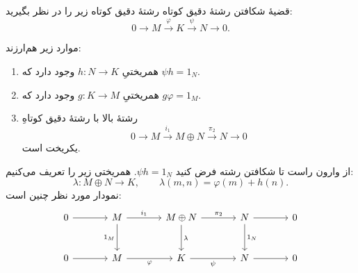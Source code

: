\begin{frame}[t]{قضیهٔ شکافتن رشتهٔ دقیق کوتاه}
    \label{lec16:splitting-lemma}
    رشتهٔ دقیق کوتاه زیر را در نظر بگیرید:
    \[
        0\longrightarrow M\xrightarrow{\varphi}K
        \xrightarrow{\psi}N\longrightarrow0.
    \]
    \begin{theorem}
        موارد زیر هم‌ارزند:
        \begin{enumerate}
            \item همریختیِ \(h:N\to K\) وجود دارد که \(\psi h=1_N\).
            \item همریختیِ \(g:K\to M\) وجود دارد که \(g\varphi=1_M\).
            \item رشتهٔ بالا با رشتهٔ دقیق کوتاهِ
            \[
                0\longrightarrow M\xrightarrow{i_1}M\oplus N
                \xrightarrow{\pi_2}N\longrightarrow0
            \]
            یکریخت است.
        \end{enumerate}
    \end{theorem}
\end{frame}

\begin{frame}[t]{از وارون راست تا شکافتن رشته}
    \label{lec16:split-right-map}
    فرض کنید \(\psi h=1_N\). همریختی زیر را تعریف می‌کنیم:
    \[
        \lambda:M\oplus N\longrightarrow K,
        \qquad \lambda(m,n)=\varphi(m)+h(n).
    \]
    نمودار مورد نظر چنین است:
    \[
    \begin{tikzcd}[ampersand replacement=\&,column sep=large,row sep=large]
        0\arrow[r]\& M\arrow[r,"i_1"]\arrow[d,"1_M"']
        \&M\oplus N\arrow[r,"\pi_2"]\arrow[d,"\lambda"]
        \&N\arrow[r]\arrow[d,"1_N"]\&0\\
        0\arrow[r]\& M\arrow[r,"\varphi"']
        \&K\arrow[r,"\psi"']\&N\arrow[r]\&0
    \end{tikzcd}
    \]
\end{frame}

